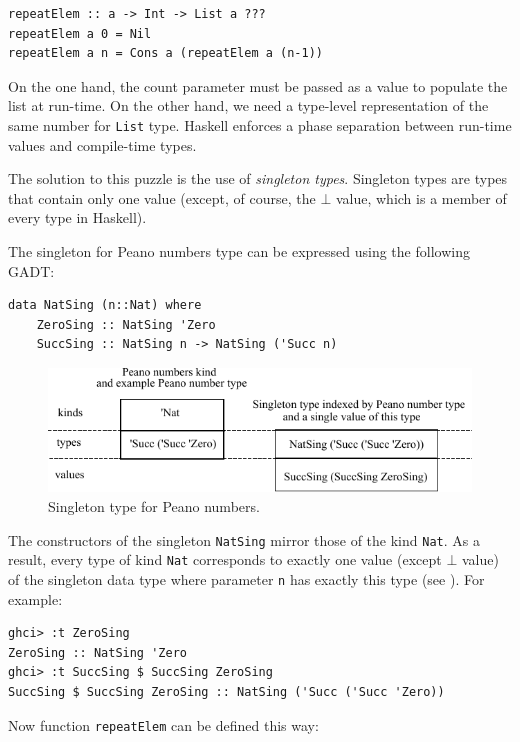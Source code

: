 \documentclass{tmr}
\newcommand{\italic}[1]{\textit{#1}}
\begin{document}
\begin{Verbatim}
repeatElem :: a -> Int -> List a ???
repeatElem a 0 = Nil
repeatElem a n = Cons a (repeatElem a (n-1))
\end{Verbatim}

On the one hand, the count parameter must be passed as a value to populate the list at run-time. On the other hand, we need a type-level representation of the same number for \verb|List| type. Haskell enforces a phase separation between run-time values and compile-time types.

The solution to this puzzle is the use of \italic{singleton types}. Singleton types are types that contain only one value (except, of course, the $\bot$ value, which is a member of every type in Haskell).

The singleton for Peano numbers type can be expressed using the following GADT:

\begin{Verbatim}
data NatSing (n::Nat) where
    ZeroSing :: NatSing 'Zero
    SuccSing :: NatSing n -> NatSing ('Succ n)
\end{Verbatim}

\begin{figure}
\centering
\includegraphics{singleton}
\vspace{5pt}
\caption{Singleton type for Peano numbers.}
\label{fig:singleton}
\end{figure}

The constructors of the singleton \verb|NatSing| mirror those of the kind \verb|Nat|. As a result, every type of kind \verb|Nat| corresponds to exactly one value (except $\bot$ value) of the singleton data type where parameter \verb|n| has exactly this type (see ). For example:

\begin{Verbatim}
ghci> :t ZeroSing
ZeroSing :: NatSing 'Zero
ghci> :t SuccSing $ SuccSing ZeroSing
SuccSing $ SuccSing ZeroSing :: NatSing ('Succ ('Succ 'Zero))
\end{Verbatim}

Now function \verb|repeatElem| can be defined this way:
\end{document}
